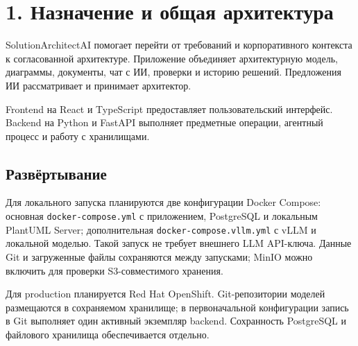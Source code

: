 \documentclass[11pt,a4paper]{article}
\begin{document}
\section{1. Назначение и общая архитектура}\label{1-ux43dux430ux437ux43dux430ux447ux435ux43dux438ux435-ux438-ux43eux431ux449ux430ux44f-ux430ux440ux445ux438ux442ux435ux43aux442ux443ux440ux430}

SolutionArchitectAI помогает перейти от требований и корпоративного контекста к согласованной архитектуре. Приложение объединяет архитектурную модель, диаграммы, документы, чат с ИИ, проверки и историю решений. Предложения ИИ рассматривает и принимает архитектор.

Frontend на React и TypeScript предоставляет пользовательский интерфейс. Backend на Python и FastAPI выполняет предметные операции, агентный процесс и работу с хранилищами.

\subsection{Развёртывание}\label{ux440ux430ux437ux432ux451ux440ux442ux44bux432ux430ux43dux438ux435}

Для локального запуска планируются две конфигурации Docker Compose: основная \texttt{docker-compose.yml} с приложением, PostgreSQL и локальным PlantUML Server; дополнительная \texttt{docker-compose.vllm.yml} с vLLM и локальной моделью. Такой запуск не требует внешнего LLM API-ключа. Данные Git и загруженные файлы сохраняются между запусками; MinIO можно включить для проверки S3-совместимого хранения.

Для production планируется Red Hat OpenShift. Git-репозитории моделей размещаются в сохраняемом хранилище; в первоначальной конфигурации запись в Git выполняет один активный экземпляр backend. Сохранность PostgreSQL и файлового хранилища обеспечивается отдельно.

\clearpage
\end{document}

